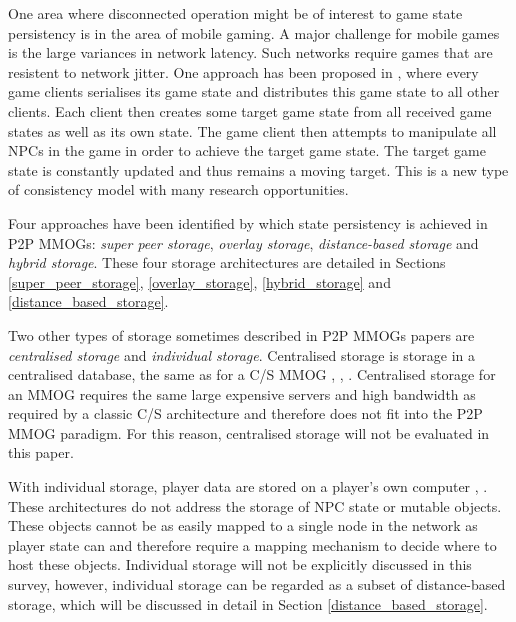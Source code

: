\documentclass[10pt,a4paper,journal,cspaper,compsoc]{IEEEtran}
\begin{document}
One area where disconnected operation might be of interest to game state persistency is in the area of mobile gaming. A major challenge for mobile
games is the large variances in network latency. Such networks require games that are resistent to network jitter. One approach has been proposed in
\cite{Chandler_disconnected_games}, where every game clients serialises its game state and distributes this game state to all other clients. Each
client then creates some target game state from all received game states as well as its own state. The game client then attempts to manipulate all
NPCs in the game in order to achieve the target game state. The target game state is constantly updated and thus remains a moving target. This is a
new type of consistency model with many research opportunities.

Four approaches have been identified by which state persistency is achieved in P2P MMOGs: \emph{super peer storage}, \emph{overlay storage},
\emph{distance-based storage} and \emph{hybrid storage}. These four storage architectures are detailed in Sections \ref{super_peer_storage},
\ref{overlay_storage}, \ref{hybrid_storage} and \ref{distance_based_storage}.

Two other types of storage sometimes described in P2P MMOGs papers are \emph{centralised storage} and \emph{individual storage}. Centralised storage
is storage in a centralised database, the same as for a C/S MMOG \cite{badumna_engine}, \cite{rooney_centralised_storage},
\cite{hybrid_p2p_cs_centralised}. Centralised storage for an MMOG requires the same large expensive servers and high bandwidth as required by a
classic C/S architecture and therefore does not fit into the P2P MMOG paradigm. For this reason, centralised storage will not be evaluated in this
paper.

With individual storage, player data are stored on a player's own computer \cite{individual_storage1}, \cite{cheat_proof_playout}. These
architectures do not address the storage of NPC state or mutable objects. These objects cannot be as easily mapped to a single node in the network as
player state can and therefore require a mapping mechanism to decide where to host these objects. Individual storage will not be explicitly discussed
in this survey, however, individual storage can be regarded as a subset of distance-based storage, which will be discussed in detail in Section
\ref{distance_based_storage}.
\end{document}
